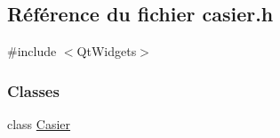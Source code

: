 \hypertarget{ihm-estock_2casier_8h}{}\subsection{Référence du fichier casier.\+h}
\label{ihm-estock_2casier_8h}
{\ttfamily \#include $<$Qt\+Widgets$>$}\newline
\subsubsection*{Classes}
\begin{DoxyCompactItemize}
\item 
class \hyperlink{class_casier}{Casier}
\end{DoxyCompactItemize}

